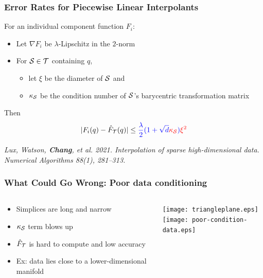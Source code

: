 \documentclass[aspectratio=169]{beamer}
\begin{document}
\begin{frame}\frametitle{Error Rates for Piecewise Linear Interpolants}
For an individual component function $F_i$:
\begin{itemize}
\item Let $\nabla F_i$ be $\lambda$-Lipschitz in the $2$-norm\\
\item For ${\cal S}\in {\cal T}$ containing $q$,
\begin{itemize}
\item let $\xi$ be the diameter of ${\cal S}$ and
\item $\kappa_{\cal S}$ be the condition number of ${\cal S}$'s
barycentric transformation matrix
\end{itemize}
\end{itemize}
\bigskip
Then
$$
|F_i(q) - {\hat F}_{\cal T}(q)| \leq
{\color{blue} \frac{\lambda}{2}(1 + \sqrt{d}{\color{red}\kappa_{\cal S}})}
{\color{red} \xi^2}
$$

\bigskip

\vfill

{\small \it Lux, Watson, {\bf Chang}, et al. 2021. Interpolation of sparse high-dimensional data. Numerical Algorithms 88(1), 281--313.}

\end{frame}

\begin{frame}\frametitle{What Could Go Wrong: Poor data conditioning}
\begin{columns}
\begin{column}{0.6\textwidth}
\begin{itemize}
\pause
\item Simplices are long and narrow
\item {\color{red} $\kappa_{\cal S}$ term blows up}
\item ${\hat F}_{\cal T}$ is hard to compute and low accuracy
\item Ex: data lies close to a lower-dimensional manifold
\end{itemize}
\end{column}
\begin{column}{0.4\textwidth}
\begin{center}
\texttt{[image: triangleplane.eps]}\\

\texttt{[image: poor-condition-data.eps]}
\end{center}
\end{column}
\end{columns}
\end{frame}
\end{document}
